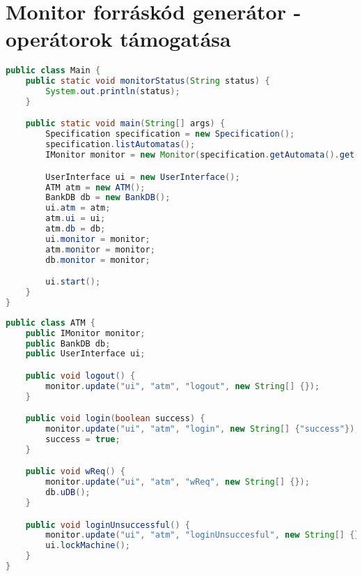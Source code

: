 \clearpage\section{Monitor forráskód generátor - operátorok támogatása}

\begin{lstlisting}[language=java, frame=single, float=ht!, caption={7.1. szcenárióhoz tartozó Main osztály.},captionpos=b]
public class Main {
	public static void monitorStatus(String status) {
		System.out.println(status);
	}

	public static void main(String[] args) {
		Specification specification = new Specification();
		specification.listAutomatas();
		IMonitor monitor = new Monitor(specification.getAutomata().get(0));

		UserInterface ui = new UserInterface();
		ATM atm = new ATM();
		BankDB db = new BankDB();
		ui.atm = atm;
		atm.ui = ui;
		atm.db = db;
		ui.monitor = monitor;
		atm.monitor = monitor;
		db.monitor = monitor;

		ui.start();
	}
}
\end{lstlisting}

\begin{lstlisting}[language=java, frame=single, float=ht!, caption={7.1. szcenárióhoz tartozó rendszer \textit{ATM} \textit{Java} osztálya.},captionpos=b]
public class ATM {
	public IMonitor monitor;
	public BankDB db;
	public UserInterface ui;

	public void logout() {
		monitor.update("ui", "atm", "logout", new String[] {});
	}

	public void login(boolean success) {
		monitor.update("ui", "atm", "login", new String[] {"success"});
		success = true;
	}

	public void wReq() {
		monitor.update("ui", "atm", "wReq", new String[] {});
		db.uDB();
	}

	public void loginUnsuccessful() {
		monitor.update("ui", "atm", "loginUnsuccesful", new String[] {});
		ui.lockMachine();
	}
}
\end{lstlisting}


